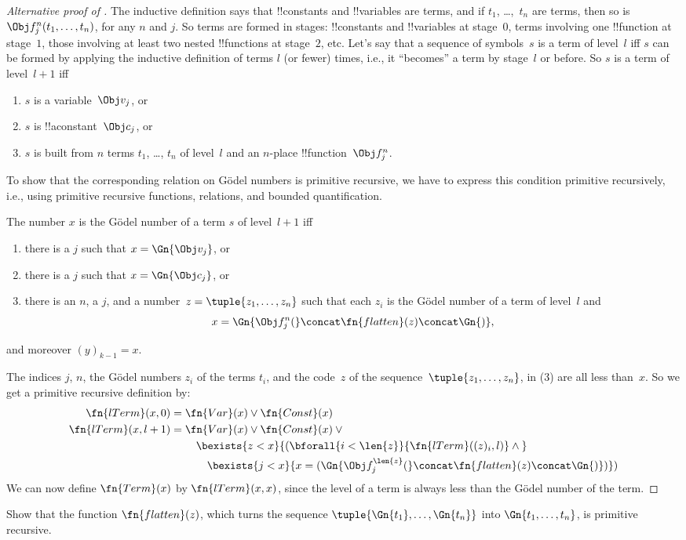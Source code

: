 \documentclass[../../../include/open-logic-section]{subfiles}
\begin{document}
\begin{proof}[Alternative proof of ]
The inductive definition says that !!{constant}s and !!{variable}s are
terms, and if $t_1$, \dots,~$t_n$ are terms, then so is $\Obj
f^n_j(t_1, \dots, t_n)$, for any $n$ and $j$. So terms are formed in
stages: !!{constant}s and !!{variable}s at stage~$0$, terms involving
one !!{function} at stage~$1$, those involving at least two nested
!!{function}s at stage~$2$, etc.  Let's say that a sequence of
symbols~$s$ is a term of level~$l$ iff $s$ can be formed by applying
the inductive definition of terms $l$ (or fewer) times, i.e., it
``becomes'' a term by stage~$l$ or before.  So $s$ is a term of
level~$l+1$ iff
\begin{enumerate}
\item $s$ is a variable~$\Obj v_j$, or
\item $s$ is !!a{constant}~$\Obj c_j$, or
\item $s$ is built from $n$ terms $t_1$, \dots, $t_n$ of level~$l$
  and an $n$-place !!{function}~$\Obj f^n_j$.
\end{enumerate}
To show that the corresponding relation on G\"odel numbers is
primitive recursive, we have to express this condition primitive
recursively, i.e., using primitive recursive functions, relations, and
bounded quantification.

The number $x$ is the G\"odel number of a term $s$ of level~$l+1$ iff
\begin{enumerate}
\item there is a $j$ such that $x = \Gn{\Obj v_j}$, or
\item there is a $j$ such that $x = \Gn{\Obj c_j}$, or
\item there is an $n$, a $j$, and a number~$z = \tuple{z_1, \dots, z_n}$ such
  that each $z_i$ is the G\"odel number of a term of level~$l$ and
\[
x = \Gn{\Obj f^n_j(} \concat \fn{flatten}(z) \concat \Gn{)},
\]
\end{enumerate}
and moreover $(y)_{k-1} = x$.

The indices $j$, $n$, the G\"odel numbers $z_i$ of the terms $t_i$,
and the code~$z$ of the sequence~$\tuple{z_1, \dots, z_n}$, in (3) are
all less than~$x$. So we get a primitive recursive definition by:
\begin{align*}
\fn{lTerm}(x, 0) = {}& \fn{Var}(x) \lor \fn{Const}(x)\\
\fn{lTerm}(x, l+1) = {} & \fn{Var}(x) \lor \fn{Const}(x) \lor {}\\
& \quad \bexists{z<x}{(\bforall{i<\len{z}}{\fn{lTerm}((z)_i, l)} \land {}}\\
& \qquad \bexists{j<x}{x = (\Gn{\Obj f^{\len{z}}_j(} \concat
\fn{flatten}(z) \concat \Gn{)})})
\end{align*}
We can now define $\fn{Term}(x)$ by $\fn{lTerm}(x, x)$, since the level
of a term is always less than the G\"odel number of the term.
\end{proof}

\begin{prob}
Show that the function $\fn{flatten}(z)$, which turns the sequence
$\tuple{\Gn{t_1}, \dots, \Gn{t_n}}$ into $\Gn{t_1, \dots, t_n}$, is
primitive recursive.
\end{prob}
\end{document}
